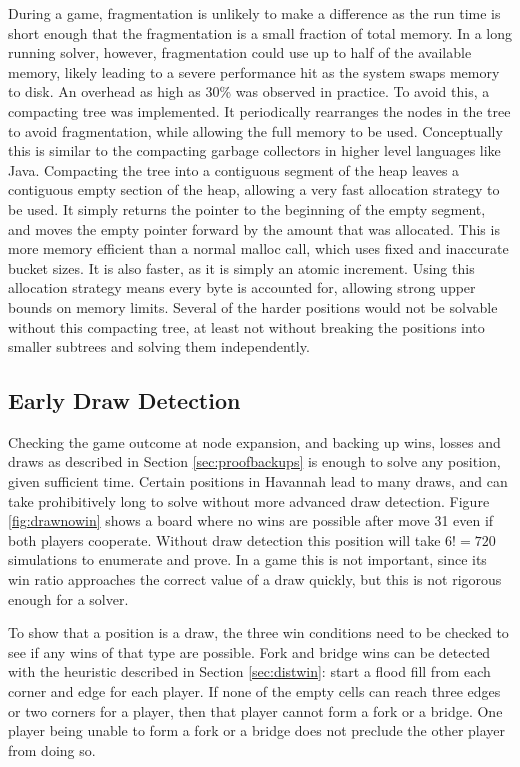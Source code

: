 During a game, fragmentation is unlikely to make a difference as the run time is short enough that the fragmentation is a small fraction of total memory. In a long running solver, however, fragmentation could use up to half of the available memory, likely leading to a severe performance hit as the system swaps memory to disk. An overhead as high as 30\% was observed in practice. To avoid this, a compacting tree was implemented. It periodically rearranges the nodes in the tree to avoid fragmentation, while allowing the full memory to be used. Conceptually this is similar to the compacting garbage collectors in higher level languages like Java. Compacting the tree into a contiguous segment of the heap leaves a contiguous empty section of the heap, allowing a very fast allocation strategy to be used. It simply returns the pointer to the beginning of the empty segment, and moves the empty pointer forward by the amount that was allocated. This is more memory efficient than a normal malloc call, which uses fixed and inaccurate bucket sizes. It is also faster, as it is simply an atomic increment. Using this allocation strategy means every byte is accounted for, allowing strong upper bounds on memory limits. Several of the harder positions would not be solvable without this compacting tree, at least not without breaking the positions into smaller subtrees and solving them independently.

\subsection{Early Draw Detection}\label{sec:drawdetect}

Checking the game outcome at node expansion, and backing up wins, losses and draws as described in Section \ref{sec:proofbackups} is enough to solve any position, given sufficient time. Certain positions in Havannah lead to many draws, and can take prohibitively long to solve without more advanced draw detection. Figure \ref{fig:drawnowin} shows a board where no wins are possible after move 31 even if both players cooperate. Without draw detection this position will take $6!=720$ simulations to enumerate and prove. In a game this is not important, since its win ratio approaches the correct value of a draw quickly, but this is not rigorous enough for a solver.

To show that a position is a draw, the three win conditions need to be checked to see if any wins of that type are possible. Fork and bridge wins can be detected with the heuristic described in Section \ref{sec:distwin}: start a flood fill from each corner and edge for each player. If none of the empty cells can reach three edges or two corners for a player, then that player cannot form a fork or a bridge. One player being unable to form a fork or a bridge does not preclude the other player from doing so.

